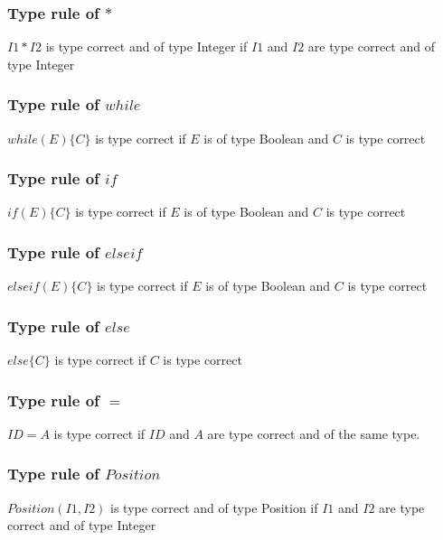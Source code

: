 	\subsubsection*{Type rule of $*$}
		$I1 * I2$ is type correct and of type Integer
		if $I1$ and $I2$ are type correct and of type Integer
	\subsubsection*{Type rule of $while$}
		$while(E)\{C\}$ is type correct
		if $E$ is of type Boolean and $C$ is type correct
	\subsubsection*{Type rule of $if$}
		$if(E)\{C\}$ is type correct
		if $E$ is of type Boolean and $C$ is type correct
	\subsubsection*{Type rule of $else if$}
		$else if(E)\{C\}$ is type correct
		if $E$ is of type Boolean and $C$ is type correct
	\subsubsection*{Type rule of $else$}
		$else\{C\}$ is type correct
		if $C$ is type correct
	\subsubsection*{Type rule of $=$}
		$ID = A$ is type correct
		if $ID$ and $A$ are type correct and of the same type.
	\subsubsection*{Type rule of $Position$}
		$Position(I1,I2)$ is type correct and of type Position
		if $I1$ and $I2$ are type correct and of type Integer
	
		